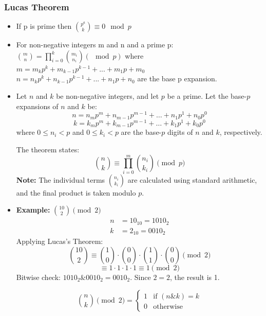 \subsubsection{Lucas Theorem}
\vspace{2.5mm}
\begin{itemize}
    \item If p is prime then $\binom{p^a}{k}\equiv 0\mod p$
    \item For non-negative integers m and n and a prime p:\\ $\binom{m}{n} =
              \prod\limits_{i=0}^k \binom{m_i}{n_i}(\mod p)$ where \\ $m =
              m_kp^k+m_{k-1}p^{k-1}+...+m_1p+m_0$ $n = n_kp^k+n_{k-1}p^{k-1}+...+n_1p+n_0$
          are the base p expansion.
    \item Let $n$ and $k$ be non-negative integers, and let $p$ be a prime. Let the
          base-$p$ expansions of $n$ and $k$ be: $$ n = n_m p^m + n_{m-1} p^{m-1} + \dots
              + n_1 p^1 + n_0 p^0 $$ $$ k = k_m p^m + k_{m-1} p^{m-1} + \dots + k_1 p^1 + k_0
              p^0 $$ where $0 \le n_i < p$ and $0 \le k_i < p$ are the base-$p$ digits of $n$
          and $k$, respectively.

          The theorem states: $$ \binom{n}{k} \equiv \prod_{i=0}^m \binom{n_i}{k_i}
              \pmod{p} $$ \noindent \textbf{Note:} The individual terms $\binom{n_i}{k_i}$
          are calculated using standard arithmetic, and the final product is taken modulo
          $p$.

    \item \textbf{Example:} $\binom{10}{2} \pmod{2}$
          \begin{align*}
              n & = 10_{10} = 1010_2 \\
              k & = 2_{10} = 0010_2
          \end{align*}
          Applying Lucas's Theorem:
          $$
              \binom{10}{2} \equiv \binom{1}{0} \cdot \binom{0}{0} \cdot \binom{1}{1} \cdot \binom{0}{0} \pmod{2}
          $$
          $$
              \equiv 1 \cdot 1 \cdot 1 \cdot 1 \equiv 1 \pmod{2}
          $$
          Bitwise check: $1010_2 \mathbf{\&} 0010_2 = 0010_2$. Since $2=2$, the result is 1.

          $$
              \binom{n}{k} \pmod{2} =
              \begin{cases}
                  1 & \text{if } (n \mathbf{\&} k) = k \\
                  0 & \text{otherwise}
              \end{cases}
          $$

\end{itemize}
